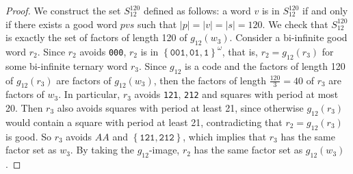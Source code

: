\documentclass{article}
\def\acc#1{\left\{ #1 \right\}}
\theoremstyle{plain}
\theoremstyle{definition}
\theoremstyle{remark}
\begin{document}
\begin{proof}
We construct the set $S_{12}^{120}$ defined as follows:
a word $v$ is in $S_{12}^{120}$ if and only if there exists a good word $pvs$ such that $|p|=|v|=|s|=120$.
We check that $S_{12}^{120}$ is exactly the set of factors of length 120 of $g_{12}(w_3)$.
Consider a bi-infinite good word $r_2$. Since $r_2$ avoids \texttt{000}, $r_2$ is in $\acc{\texttt{001},\texttt{01},\texttt{1}}^\omega$,
that is, $r_2=g_{12}(r_3)$ for some bi-infinite ternary word $r_3$.
Since $g_{12}$ is a code and the factors of length 120 of $g_{12}(r_3)$ are factors of $g_{12}(w_3)$,
then the factors of length $\tfrac{120}{3}=40$ of $r_3$ are factors of $w_3$.
In particular, $r_3$ avoids \texttt{121}, \texttt{212} and squares with period at most 20.
Then $r_3$ also avoids squares with period at least 21, since otherwise $g_{12}(r_3)$
would contain a square with period at least 21, contradicting that $r_2=g_{12}(r_3)$ is good.
So $r_3$ avoids $AA$ and $\acc{\texttt{121},\texttt{212}}$, which implies that 
$r_3$ has the same factor set as $w_3$.
By taking the $g_{12}$-image, $r_2$ has the same factor set as $g_{12}(w_3)$.
\end{proof}


\end{document}
